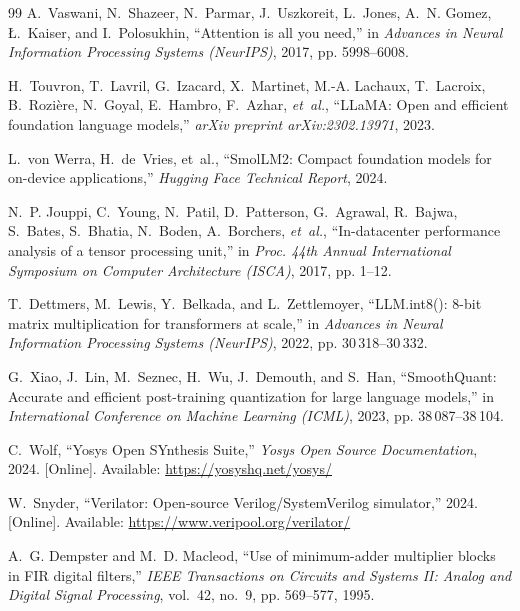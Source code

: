 \documentclass[11pt,a4paper]{article}
\begin{document}
\begin{thebibliography}{99}
A.~Vaswani, N.~Shazeer, N.~Parmar, J.~Uszkoreit, L.~Jones, A.~N. Gomez, {\L}.~Kaiser, and I.~Polosukhin, ``Attention is all you need,'' in \emph{Advances in Neural Information Processing Systems (NeurIPS)}, 2017, pp. 5998--6008.

H.~Touvron, T.~Lavril, G.~Izacard, X.~Martinet, M.-A. Lachaux, T.~Lacroix, B.~Rozi{\`e}re, N.~Goyal, E.~Hambro, F.~Azhar, \emph{et~al.}, ``LLaMA: Open and efficient foundation language models,'' \emph{arXiv preprint arXiv:2302.13971}, 2023.

L.~von Werra, H.~de~Vries, et~al., ``SmolLM2: Compact foundation models for on-device applications,'' \emph{Hugging Face Technical Report}, 2024.

N.~P. Jouppi, C.~Young, N.~Patil, D.~Patterson, G.~Agrawal, R.~Bajwa, S.~Bates, S.~Bhatia, N.~Boden, A.~Borchers, \emph{et~al.}, ``In-datacenter performance analysis of a tensor processing unit,'' in \emph{Proc. 44th Annual International Symposium on Computer Architecture (ISCA)}, 2017, pp. 1--12.

T.~Dettmers, M.~Lewis, Y.~Belkada, and L.~Zettlemoyer, ``LLM.int8(): 8-bit matrix multiplication for transformers at scale,'' in \emph{Advances in Neural Information Processing Systems (NeurIPS)}, 2022, pp. 30\,318--30\,332.

G.~Xiao, J.~Lin, M.~Seznec, H.~Wu, J.~Demouth, and S.~Han, ``SmoothQuant: Accurate and efficient post-training quantization for large language models,'' in \emph{International Conference on Machine Learning (ICML)}, 2023, pp. 38\,087--38\,104.

C.~Wolf, ``Yosys Open SYnthesis Suite,'' \emph{Yosys Open Source Documentation}, 2024. [Online]. Available: \url{https://yosyshq.net/yosys/}

W.~Snyder, ``Verilator: Open-source Verilog/SystemVerilog simulator,'' 2024. [Online]. Available: \url{https://www.veripool.org/verilator/}

A.~G. Dempster and M.~D. Macleod, ``Use of minimum-adder multiplier blocks in FIR digital filters,'' \emph{IEEE Transactions on Circuits and Systems II: Analog and Digital Signal Processing}, vol.~42, no.~9, pp. 569--577, 1995.


\end{thebibliography}
\end{document}
